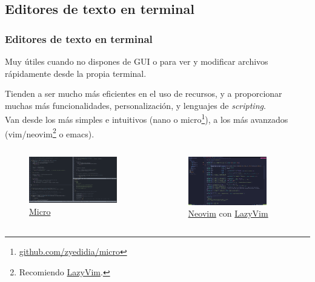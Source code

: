\documentclass[aspectratio=43]{beamer}
\begin{document}
\subsection{Editores de texto en terminal}

\begin{frame}
    \frametitle{Editores de texto en terminal}
    Muy útiles cuando no dispones de GUI o para ver y modificar archivos rápidamente desde la propia terminal.\newline

    Tienden a ser mucho más eficientes en el uso de recursos, y a proporcionar muchas más funcionalidades, personalización, y lenguajes de \textit{scripting}.\\
    Van desde los más simples e intuitivos (nano o micro\footnote{\href{https://github.com/zyedidia/micro}{github.com/zyedidia/micro}}), a los más avanzados (vim/neovim\footnote{Recomiendo \href{https://www.lazyvim.org/}{LazyVim}.} o emacs).

    \begin{columns}[c]
        \begin{column}{0.4\textwidth}
            \begin{figure}
                \centering
                \includegraphics[width=0.9\textwidth]{img/micro.png}
                \caption{\href{https://github.com/zyedidia/micro}{Micro}}
            \end{figure}
        \end{column}
        \begin{column}{0.4\textwidth}
            \begin{figure}
                \centering
                \includegraphics[width=0.8\textwidth]{img/lazyvim.png}
                \caption{\href{https://neovim.io/}{Neovim} con \href{https://www.lazyvim.org/}{LazyVim}}
            \end{figure}
        \end{column}
    \end{columns}


\end{frame}
\end{document}
